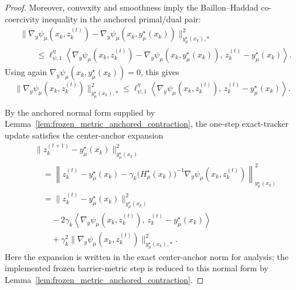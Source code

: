 \documentclass{article}
\begin{document}
\begin{proof}
Moreover, convexity and smoothness imply the Baillon--Haddad co-coercivity inequality in the
anchored primal/dual pair:
\begin{align}
&\|\nabla_y\psi_\mu(x_k,z_k^{(t)})
-
\nabla_y\psi_\mu(x_k,y_\mu^\star(x_k))
\|_{y_\mu^\star(x_k),*}^2
\nonumber\\
&\qquad\le
\ell_{\psi,1}^\eta
\left\langle
\nabla_y\psi_\mu(x_k,z_k^{(t)})
-
\nabla_y\psi_\mu(x_k,y_\mu^\star(x_k)),
\,z_k^{(t)}-y_\mu^\star(x_k)
\right\rangle .
\label{eq:exact_tracker_cocoercive}
\end{align}
Using again \(\nabla_y\psi_\mu(x_k,y_\mu^\star(x_k))=0\), this gives
\begin{equation}
\label{eq:exact_tracker_grad_sq}
\|\nabla_y\psi_\mu(x_k,z_k^{(t)})\|_{y_\mu^\star(x_k),*}^2
\le
\ell_{\psi,1}^\eta
\left\langle
\nabla_y\psi_\mu(x_k,z_k^{(t)}),
\,z_k^{(t)}-y_\mu^\star(x_k)
\right\rangle .
\end{equation}

By the anchored normal form supplied by
Lemma~\ref{lem:frozen_metric_anchored_contraction}, the one-step exact-tracker update satisfies the
center-anchor expansion
\begin{align*}
&\|z_k^{(t+1)}-y_\mu^\star(x_k)\|_{y_\mu^\star(x_k)}^2 \\
&\quad =
\left\|
z_k^{(t)}-y_\mu^\star(x_k)
-
\gamma_k\bigl(H_\mu^\star(x_k)\bigr)^{-1}
\nabla_y\psi_\mu(x_k,z_k^{(t)})
\right\|_{y_\mu^\star(x_k)}^2 \\
&\quad =
\|z_k^{(t)}-y_\mu^\star(x_k)\|_{y_\mu^\star(x_k)}^2 \\
&\qquad
-2\gamma_k
\left\langle
\nabla_y\psi_\mu(x_k,z_k^{(t)}),
\,z_k^{(t)}-y_\mu^\star(x_k)
\right\rangle \\
&\qquad
+\gamma_k^2
\|\nabla_y\psi_\mu(x_k,z_k^{(t)})\|_{y_\mu^\star(x_k),*}^2 .
\end{align*}
Here the expansion is written in the exact center-anchor norm for analysis; the implemented frozen
barrier-metric step is reduced to this normal form by
Lemma~\ref{lem:frozen_metric_anchored_contraction}.


\end{proof}
\end{document}
